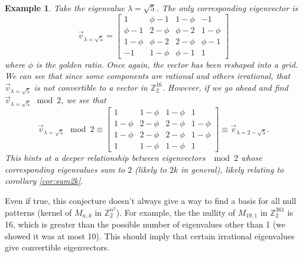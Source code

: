 \documentclass[12pt]{article}
\newtheorem{example}{Example}
\newcommand{\Z}{\mathbb{Z}}
\begin{document}
\begin{example}
		Take the eigenvalue $\lambda=\sqrt{5}$.
		The only corresponding eigenvector is
		\begin{equation*}
		\vec{v}_{\lambda=\sqrt{5}} = \begin{bmatrix}
		1 & \phi-1 & 1-\phi & -1 \\
		\phi-1 & 2-\phi & \phi-2 & 1-\phi \\
		1-\phi & \phi-2 & 2-\phi & \phi-1 \\
		-1 & 1-\phi & \phi-1 & 1
		\end{bmatrix}
		\end{equation*}
		where $\phi$ is the golden ratio.
		Once again, the vector has been reshaped into a grid.
		We can see that since some components are rational and others irrational,
		that $\vec{v}_{\lambda=\sqrt{5}}$ is not convertible to a vector in $\Z_2^{16}$.
		However, if we go ahead and find $\vec{v}_{\lambda=\sqrt{5}} \mod 2$, we see
		that
		\begin{equation*}
		\vec{v}_{\lambda=\sqrt{5}} \mod 2 \equiv \begin{bmatrix}
		1 & 1-\phi & 1-\phi & 1 \\
		1-\phi & 2-\phi & 2-\phi & 1-\phi \\
		1-\phi & 2-\phi & 2-\phi & 1-\phi \\
		1 & 1-\phi & 1-\phi & 1
		\end{bmatrix} \equiv \vec{v}_{\lambda=2-\sqrt{5}}.
		\end{equation*}
		This hints at a deeper relationship between eigenvectors $\mod 2$ whose
		corresponding eigenvalues sum to $2$ (likely to $2k$ in general), likely
		relating to corollary \ref{cor:sum2k}. 
	\end{example}
	Even if true, this conjecture doesn't always give a way to find a basis for
	all null patterns (kernel of $M_{n,k}$ in $\Z_2^{n^2}$).
	For example, the the nullity of $M_{19,1}$ in $\Z_{2}^{361}$ is 16, which is
	greater than the possible number of eigenvalues other than 1 (we showed it was
	at most 10).
	This should imply that certain irrational eigenvalues give convertible
	eigenvectors.
	
\end{document}

